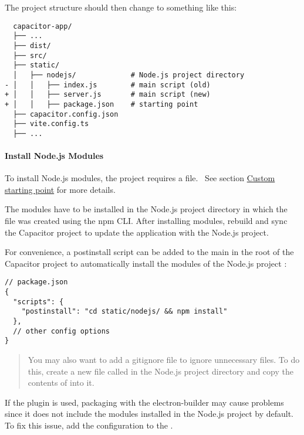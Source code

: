 The project structure should then change to something like this:

\begin{verbatim}
  capacitor-app/
  ├── ...
  ├── dist/
  ├── src/
  ├── static/
  │   ├── nodejs/             # Node.js project directory
- │   │   ├── index.js        # main script (old)
+ │   │   ├── server.js       # main script (new)
+ │   │   ├── package.json    # starting point
  ├── capacitor.config.json
  ├── vite.config.ts
  ├── ...
\end{verbatim}

\newpage

\paragraph{Install Node.js Modules}
\label{sec:Capacitor-NodeJS:InstallModules}

To install Node.js modules, the project requires a  file.~\cite{npm}
See section \hyperref[sec:Capacitor-NodeJS:CustomStartingPoint]{Custom starting point} for more details.

The modules have to be installed in the Node.js project directory in which the  file was created using the npm CLI.
After installing modules, rebuild and sync the Capacitor project to update the application with the Node.js project.

For convenience, a postinstall script can be added to the main  in the root of the Capacitor project to automatically install the modules of the Node.js project \cite{npm}:

\begin{verbatim}
// package.json
{
  "scripts": {
    "postinstall": "cd static/nodejs/ && npm install"
  },
  // other config options
}
\end{verbatim}

\begin{quote}
  You may also want to add a gitignore file to ignore unnecessary files.
  To do this, create a new file called  in the Node.js project directory and copy the contents of  into it.
\end{quote}

\begin{important}[Important]
  If the  plugin is used, packaging with the electron-builder may cause problems since it does not include the modules installed in the Node.js project by default. \cite{electron-builder}
  \\[1em]
  To fix this issue, add the configuration  to the .
  \cite{electron-builder}
\end{important}


